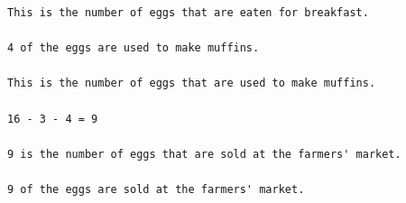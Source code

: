 \documentclass{article} %
\begin{document}
\begin{lstlisting}
This is the number of eggs that are eaten for breakfast.                                                                                                                                                                             
                                                                                                                                                                                                                                     
4 of the eggs are used to make muffins.                                                                                                                                                                                              
                                                                                                                                                                                                                                     
This is the number of eggs that are used to make muffins.                                                                                                                                                                            
                                                                                                                                                                                                                                     
16 - 3 - 4 = 9                                                                                                                                                                                                                       
                                                                                                                                                                                                                                     
9 is the number of eggs that are sold at the farmers' market.                                                                                                                                                                        
                                                                                                                                                                                                                                     
9 of the eggs are sold at the farmers' market.                                                                                                                                                                                       
                                                                                                                                                                                                                                     

\end{lstlisting}
\end{document}
